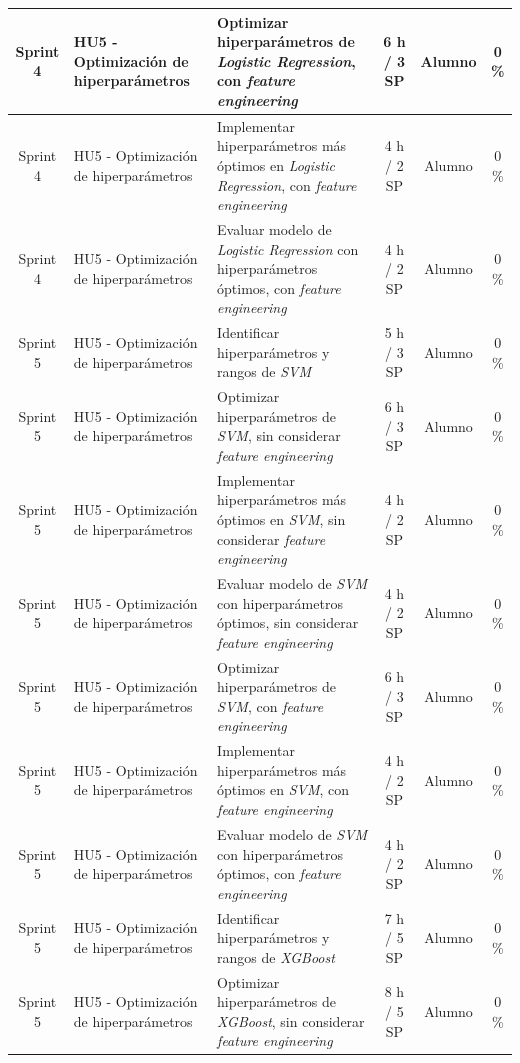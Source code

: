 \documentclass[
11pt, %
]{charter}
\begin{document}
\begin{xltabular}{\linewidth}{@{}|c|X|X|c|c|c|@{}}
Sprint 4 & HU5 - Optimización de hiperparámetros & Optimizar hiperparámetros de \textit{Logistic Regression}, con \textit{feature engineering}  & 6 h / 3 SP & Alumno & 0 \% \\ \hline
Sprint 4 & HU5 - Optimización de hiperparámetros & Implementar hiperparámetros más óptimos en \textit{Logistic Regression}, con \textit{feature engineering}  & 4 h / 2 SP & Alumno & 0 \% \\ \hline
Sprint 4 & HU5 - Optimización de hiperparámetros & Evaluar modelo de \textit{Logistic Regression} con hiperparámetros óptimos, con \textit{feature engineering}  & 4 h / 2 SP & Alumno & 0 \% \\ \hline
Sprint 5 & HU5 - Optimización de hiperparámetros & Identificar hiperparámetros y rangos de \textit{SVM}  & 5 h / 3 SP & Alumno & 0 \% \\ \hline
Sprint 5 & HU5 - Optimización de hiperparámetros & Optimizar hiperparámetros de \textit{SVM}, sin considerar \textit{feature engineering}  & 6 h / 3 SP & Alumno & 0 \% \\ \hline
Sprint 5 & HU5 - Optimización de hiperparámetros & Implementar hiperparámetros más óptimos en \textit{SVM}, sin considerar \textit{feature engineering}  & 4 h / 2 SP & Alumno & 0 \% \\ \hline
Sprint 5 & HU5 - Optimización de hiperparámetros & Evaluar modelo de \textit{SVM} con hiperparámetros óptimos, sin considerar \textit{feature engineering}  & 4 h / 2 SP & Alumno & 0 \% \\ \hline
Sprint 5 & HU5 - Optimización de hiperparámetros & Optimizar hiperparámetros de \textit{SVM}, con \textit{feature engineering}  & 6 h / 3 SP & Alumno & 0 \% \\ \hline
Sprint 5 & HU5 - Optimización de hiperparámetros & Implementar hiperparámetros más óptimos en \textit{SVM}, con \textit{feature engineering}  & 4 h / 2 SP & Alumno & 0 \% \\ \hline
Sprint 5 & HU5 - Optimización de hiperparámetros & Evaluar modelo de \textit{SVM} con hiperparámetros óptimos, con \textit{feature engineering}  & 4 h / 2 SP & Alumno & 0 \% \\ \hline
Sprint 5 & HU5 - Optimización de hiperparámetros & Identificar hiperparámetros y rangos de \textit{XGBoost}  & 7 h / 5 SP & Alumno & 0 \% \\ \hline
Sprint 5 & HU5 - Optimización de hiperparámetros & Optimizar hiperparámetros de \textit{XGBoost}, sin considerar \textit{feature engineering}  & 8 h / 5 SP & Alumno & 0 \%\\ \hline

\end{xltabular}
\end{document}
